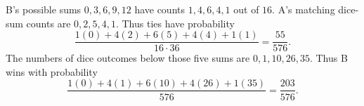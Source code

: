 B's possible sums $0,3,6,9,12$ have counts $1,4,6,4,1$ out of $16$. A's matching dice-sum counts are $0,2,5,4,1$. Thus ties have probability
\[\boxed{\dfrac{1(0)+4(2)+6(5)+4(4)+1(1)}{16\cdot36}=\dfrac{55}{576}}.\]
The numbers of dice outcomes below those five sums are $0,1,10,26,35$. Thus B wins with probability
\[\boxed{\dfrac{1(0)+4(1)+6(10)+4(26)+1(35)}{576}=\dfrac{203}{576}}.\]
